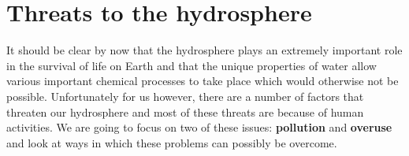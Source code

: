     \section{Threats to the hydrosphere}
            \nopagebreak
      \label{m38138*id342204}It should be clear by now that the hydrosphere plays an extremely important role in the survival of life on Earth and that the unique properties of water allow various important chemical processes to take place which would otherwise not be possible. Unfortunately for us however, there are a number of factors that threaten our hydrosphere and most of these threats are because of human activities. We are going to focus on two of these issues: \textbf{pollution} and \textbf{overuse} and look at ways in which these problems can possibly be overcome.\\
 \\
